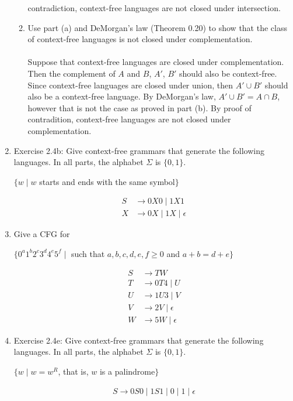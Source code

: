 \documentclass{article}
\begin{document}
\begin{enumerate}
\begin{enumerate}[label =\alph*.]
                contradiction, context-free languages are not closed under intersection.
                \item Use part (a) and DeMorgan's law (Theorem 0.20) to show that the class of context-free languages is not closed under complementation.\\\\
                Suppose that context-free languages are closed under complementation. Then the complement of $A$ and $B$, $A'$, $B'$ should also be context-free.
                Since context-free languages are closed under union, then $A'\cup B'$ should also be a context-free language. By DeMorgan's law, $A'\cup B' = A\cap B$, 
                however that is not the case as proved in part (b). By proof of contradition, context-free languages are not closed under complementation.  
            \end{enumerate}
        \item Exercise 2.4b: Give context-free grammars that generate the following languages. In all parts, the alphabet $\Sigma$ is $\{0,1\}$.
            \begin{center}
                $\{w\mid w $ starts and ends with the same symbol$\}$
            \end{center}
            \begin{align*}
                S &\rightarrow 0X0 \mid 1X1\\
                X &\rightarrow 0X \mid 1X \mid \epsilon
            \end{align*}
        \item Give a CFG for
            \begin{center}
                $\{0^a1^b2^c3^d4^e5^f \mid $ such that $ a,b,c,d,e,f\geq 0 $ and $ a+b=d+e \}$
            \end{center}
            \begin{align*}
                S &\rightarrow TW\\
                T &\rightarrow 0T4 \mid U\\
                U &\rightarrow 1U3 \mid V\\
                V &\rightarrow 2V \mid \epsilon\\
                W &\rightarrow 5W \mid \epsilon
            \end{align*}
        
        \item Exercise 2.4e: Give context-free grammars that generate the following languages. In all parts, the alphabet $\Sigma$ is $\{0,1\}$.
            \begin{center}
                $\{w\mid w=w^R$, that is, $w$ is a palindrome$\}$
            \end{center}
            \begin{align*}
                S \rightarrow 0S0 \mid 1S1 \mid 0\mid 1 \mid \epsilon
            \end{align*}


\end{enumerate}
\end{document}
